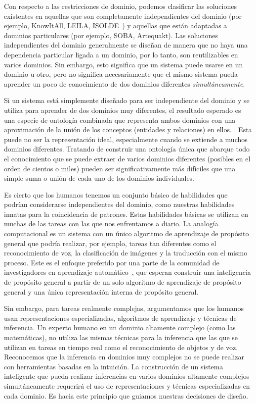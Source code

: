 Con respecto a las restricciones de dominio, podemos clasificar las soluciones existentes en aquellas que son completamente independientes del dominio (por ejemplo, KnowItAll, LEILA, ISOLDE~\cite{isolde}) y aquellas que están adaptadas
a dominios particulares (por ejemplo, SOBA, Artequakt). Las soluciones independientes del dominio generalmente se diseñan de manera que no haya una dependencia particular ligada a un dominio, por lo tanto, son reutilizables en varios dominios. Sin embargo, esto significa que un sistema puede usarse en un dominio u otro, pero no significa necesariamente que el mismo sistema pueda aprender un poco de conocimiento de dos dominios diferentes \emph{simultáneamente}.

Si un sistema está simplemente diseñado para ser independiente del dominio y se utiliza para aprender de dos dominios muy diferentes, el resultado esperado es una especie de ontología combinada que representa ambos dominios con una aproximación de la unión de los conceptos (entidades y relaciones) en ellos. . Esta puede no ser la representación ideal, especialmente cuando se extiende a muchos dominios diferentes. Tratando de construir una ontología única que abarque todo el conocimiento que se puede extraer de
varios dominios diferentes (posibles en el orden de cientos o miles) pueden ser significativamente más difíciles que una simple suma o unión de cada uno de los dominios individuales.

Es cierto que los humanos tenemos un conjunto básico de habilidades que podrían considerarse independientes del dominio, como nuestras habilidades innatas para la coincidencia de patrones. Estas habilidades básicas se utilizan en muchas de las tareas con las que nos enfrentamos a diario.
La analogía computacional es un sistema con un único algoritmo de aprendizaje de propósito general que podría realizar, por ejemplo, tareas tan diferentes como el reconocimiento de voz, la clasificación de imágenes y la traducción con el mismo proceso.
Este es el enfoque preferido por una parte de la comunidad de investigadores en aprendizaje automático~\cite{kaiser2017one},
que esperan construir una inteligencia de propósito general a partir de un solo algoritmo de aprendizaje de propósito general y una única representación interna de propósito general.

Sin embargo, para tareas realmente complejas, argumentamos que los humanos usan representaciones especializadas, algoritmos de aprendizaje y técnicas de inferencia. Un experto humano en un dominio altamente complejo (como las matemáticas), no utiliza las mismas técnicas para la inferencia que las que se utilizan en tareas en tiempo real como el reconocimiento de objetos y de voz. Reconocemos que la inferencia en dominios muy complejos no se puede realizar con herramientas basadas en la intuición. La construcción de un sistema inteligente que pueda realizar inferencias en varios dominios altamente complejos simultáneamente requerirá el uso de representaciones y técnicas especializadas en cada dominio. Es hacia este principio que guiamos nuestras decisiones de diseño.

